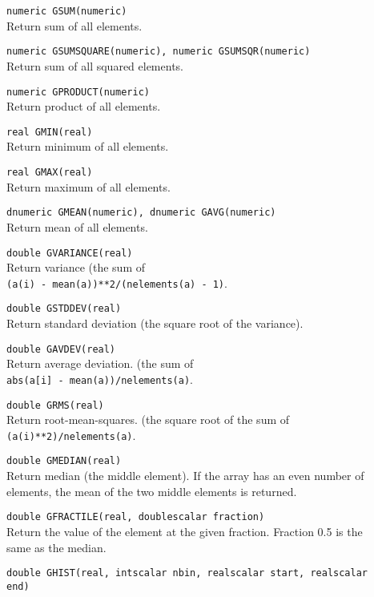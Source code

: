 \begin{description}
  \item[] \texttt{numeric GSUM(numeric)}\\
    Return sum of all elements.
  \item[] \texttt{numeric GSUMSQUARE(numeric), numeric GSUMSQR(numeric)}\\
    Return sum of all squared elements.
  \item[] \texttt{numeric GPRODUCT(numeric)}\\
    Return product of all elements.
  \item[] \texttt{real GMIN(real)}\\
    Return minimum of all elements.
  \item[] \texttt{real GMAX(real)}\\
    Return maximum of all elements.
  \item[] \texttt{dnumeric GMEAN(numeric), dnumeric GAVG(numeric)}\\
    Return mean of all elements.
  \item[] \texttt{double GVARIANCE(real)}\\
    Return variance (the sum of
    \\\texttt{(a(i) - mean(a))**2/(nelements(a) - 1)}.
  \item[] \texttt{double GSTDDEV(real)}\\
    Return standard deviation (the square root of the variance).
  \item[] \texttt{double GAVDEV(real)}\\
    Return average deviation. (the sum of
    \\\texttt{abs(a[i] - mean(a))/nelements(a)}.
  \item[] \texttt{double GRMS(real)}\\
    Return root-mean-squares. (the square root of the sum of
    \\\texttt{(a(i)**2)/nelements(a)}.
  \item[] \texttt{double GMEDIAN(real)}\\
    Return median (the middle element).
    If the array has an even number of elements, the mean of
    the two middle elements is returned.
  \item[] \texttt{double GFRACTILE(real, doublescalar fraction)}\\
    Return the value of the element at the given fraction.
    Fraction 0.5 is the same as the median.
  \item[] \texttt{double GHIST(real, intscalar nbin, realscalar start,
    realscalar end)}\\

\end{description}
